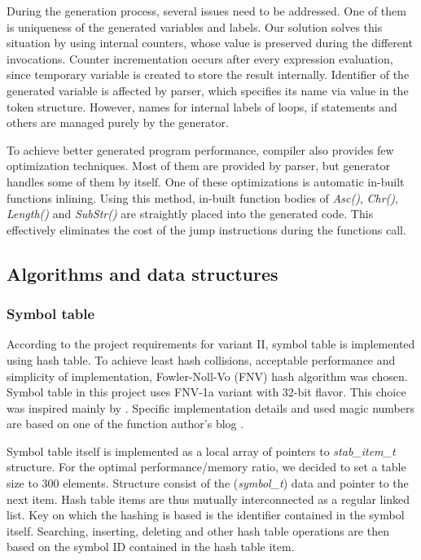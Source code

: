 \documentclass[a4paper, 11pt]{article}
\begin{document}
During the generation process, several issues need to be addressed. One of them is uniqueness of the generated variables and labels. Our solution solves this situation by using internal counters, whose value is preserved during the different invocations. Counter incrementation occurs after every expression evaluation, since temporary variable is created to store the result internally. Identifier of the generated variable is affected by parser, which specifies its name via value in the token structure. However, names for internal labels of loops, if statements and others are managed purely by the generator.

To achieve better generated program performance, compiler also provides few optimization techniques. Most of them are provided by parser, but generator handles some of them by itself. One of these optimizations is automatic in-built functions inlining. Using this method, in-built function bodies of \emph{Asc()}, \emph{Chr()}, \emph{Length()} and \emph{SubStr()} are straightly placed into the generated code. This effectively eliminates the cost of the jump instructions during the functions call.

\subsection{Algorithms and data structures}

\subsubsection{Symbol table}

According to the project requirements for variant II, symbol table is implemented using hash table. To achieve least hash collisions, acceptable performance and simplicity of implementation, Fowler-Noll-Vo (FNV) hash algorithm was chosen. Symbol table in this project uses FNV-1a variant with 32-bit flavor. This choice was inspired mainly by \cite{stackexch_sw_hash}. Specific implementation details and used magic numbers are based on one of the function author's blog \cite{noll_fnv}.

Symbol table itself is implemented as a local array of pointers to \emph{stab\_item\_t} structure. For the optimal performance/memory ratio, we decided to set a table size to 300 elements. Structure consist of the (\emph{symbol\_t}) data and pointer to the next item. Hash table items are thus mutually interconnected as a regular linked list. Key on which the hashing is based is the identifier contained in the symbol itself. Searching, inserting, deleting and other hash table operations are then based on the symbol ID contained in the hash table item.
\end{document}
